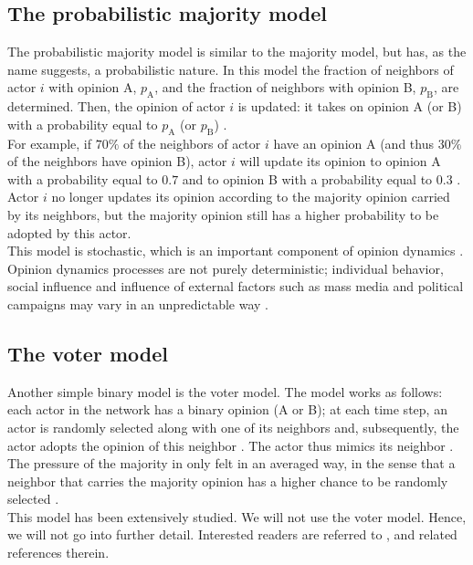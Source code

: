 \documentclass[11 pt , letterpaper , twoside , openright]{book}
\begin{document}
\subsection{The probabilistic majority model}\label{probMaj}

The probabilistic majority model is similar to the majority model, but has, as the name suggests, a probabilistic nature. In this model the fraction of neighbors of actor $i$ with opinion A, $p_\text{A}$, and the fraction of neighbors with opinion B, $p_\text{B}$, are determined. Then, the opinion of actor $i$ is updated: it takes on opinion A (or B) with a probability equal to $p_\text{A}$ (or $p_\text{B}$) \cite{Perra2019}.\\
\newline
For example, if $70\%$ of the neighbors of actor $i$ have an opinion A (and thus $30 \%$ of the neighbors have opinion B), actor $i$ will update its opinion to opinion A with a probability equal to $0.7$ and to opinion B with a probability equal to $0.3$ \cite{Perra2019}. Actor $i$ no longer updates its opinion according to the majority opinion carried by its neighbors, but the majority opinion still has a higher probability to be adopted by this actor.\\
\newline
This model is stochastic, which is an important component of opinion dynamics \cite{Castellano2009}\cite{Perra2019}. Opinion dynamics processes are not purely deterministic; individual behavior, social influence and influence of external factors such as mass media and political campaigns may vary in an unpredictable way \cite{Castellano2009}.

\subsection{The voter model}

Another simple binary model is the voter model. The model works as follows: each actor in the network has a binary opinion (A or B); at each time step, an actor is randomly selected along with one of its neighbors and, subsequently, the actor adopts the opinion of this neighbor \cite{Castellano2009}. The actor thus mimics its neighbor \cite{Castellano2009}. \\
\newline
The pressure of the majority in only felt in an averaged way, in the sense that a neighbor that carries the majority opinion has a higher chance to be randomly selected \cite{Castellano2009}.\\
\newline
This model has been extensively studied. We will not use the voter model. Hence, we will not go into further detail. Interested readers are referred to \cite{Castellano2009}, \cite{Fernandez2014} and related references therein.
\end{document}
